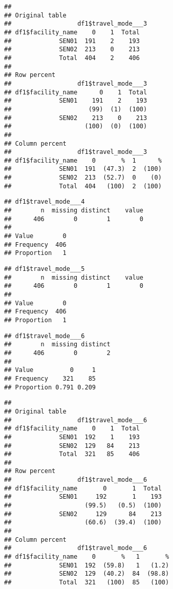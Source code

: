\documentclass[
]{article}
\begin{document}
\begin{verbatim}
## 
## Original table 
##                  df1$travel_mode___3
## df1$facility_name    0    1  Total
##             SEN01  191    2    193
##             SEN02  213    0    213
##             Total  404    2    406
## 
## Row percent 
##                  df1$travel_mode___3
## df1$facility_name      0    1  Total
##             SEN01    191    2    193
##                     (99)  (1)  (100)
##             SEN02    213    0    213
##                    (100)  (0)  (100)
## 
## Column percent 
##                  df1$travel_mode___3
## df1$facility_name    0       %  1      %
##             SEN01  191  (47.3)  2  (100)
##             SEN02  213  (52.7)  0    (0)
##             Total  404   (100)  2  (100)
\end{verbatim}

\begin{verbatim}
## df1$travel_mode___4 
##        n  missing distinct    value 
##      406        0        1        0 
##               
## Value        0
## Frequency  406
## Proportion   1
\end{verbatim}

\begin{verbatim}
## df1$travel_mode___5 
##        n  missing distinct    value 
##      406        0        1        0 
##               
## Value        0
## Frequency  406
## Proportion   1
\end{verbatim}

\begin{verbatim}
## df1$travel_mode___6 
##        n  missing distinct 
##      406        0        2 
##                       
## Value          0     1
## Frequency    321    85
## Proportion 0.791 0.209
\end{verbatim}

\begin{verbatim}
## 
## Original table 
##                  df1$travel_mode___6
## df1$facility_name    0    1  Total
##             SEN01  192    1    193
##             SEN02  129   84    213
##             Total  321   85    406
## 
## Row percent 
##                  df1$travel_mode___6
## df1$facility_name       0       1  Total
##             SEN01     192       1    193
##                    (99.5)   (0.5)  (100)
##             SEN02     129      84    213
##                    (60.6)  (39.4)  (100)
## 
## Column percent 
##                  df1$travel_mode___6
## df1$facility_name    0       %   1       %
##             SEN01  192  (59.8)   1   (1.2)
##             SEN02  129  (40.2)  84  (98.8)
##             Total  321   (100)  85   (100)
\end{verbatim}
\end{document}
